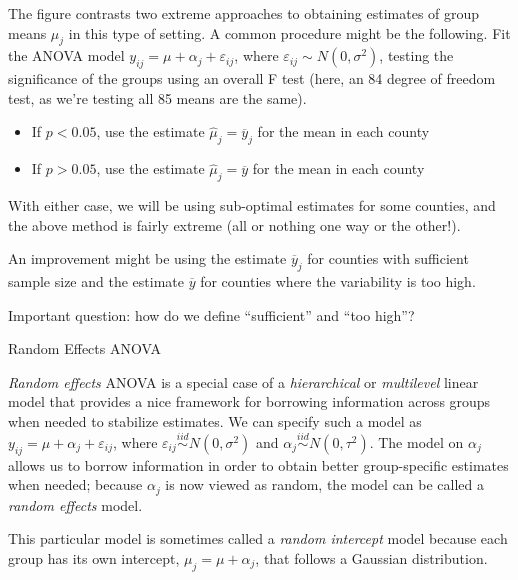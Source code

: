 \documentclass[ignorenonframetext,]{beamer}
\providecommand{\tightlist}{%
  \setlength{\itemsep}{0pt}\setlength{\parskip}{0pt}}
\begin{document}
\begin{frame}{}

The figure contrasts two extreme approaches to obtaining estimates of
group means \(\mu_j\) in this type of setting. A common procedure might
be the following. Fit the ANOVA model
\(y_{ij}=\mu+\alpha_j+\varepsilon_{ij}\), where
\(\varepsilon_{ij} \sim N(0,\sigma^2)\), testing the significance of the
groups using an overall F test (here, an 84 degree of freedom test, as
we're testing all 85 means are the same).

\begin{itemize}
\tightlist
\item
  If \(p<0.05\), use the estimate \(\widehat{\mu}_j=\overline{y}_j\) for
  the mean in each county
\item
  If \(p>0.05\), use the estimate \(\widehat{\mu}_j=\overline{y}\) for
  the mean in each county
\end{itemize}

With either case, we will be using sub-optimal estimates for some
counties, and the above method is fairly extreme (all or nothing one way
or the other!).

\end{frame}

\begin{frame}{}

An improvement might be using the estimate \(\overline{y}_j\) for
counties with sufficient sample size and the estimate \(\overline{y}\)
for counties where the variability is too high.

Important question: how do we define ``sufficient'' and ``too high''?

\end{frame}

\begin{frame}{Random Effects ANOVA}

\emph{Random effects} ANOVA is a special case of a \emph{hierarchical}
or \emph{multilevel} linear model that provides a nice framework for
borrowing information across groups when needed to stabilize estimates.
We can specify such a model as \(y_{ij}=\mu+\alpha_j+\varepsilon_{ij}\),
where \(\varepsilon_{ij} \overset{iid}{\sim} N(0,\sigma^2)\) and
\(\alpha_j \overset{iid}{\sim} N(0,\tau^2)\). The model on \(\alpha_j\)
allows us to borrow information in order to obtain better group-specific
estimates when needed; because \(\alpha_j\) is now viewed as random, the
model can be called a \emph{random effects} model.

This particular model is sometimes called a \emph{random intercept}
model because each group has its own intercept, \(\mu_j=\mu+\alpha_j\),
that follows a Gaussian distribution.

\end{frame}
\end{document}
